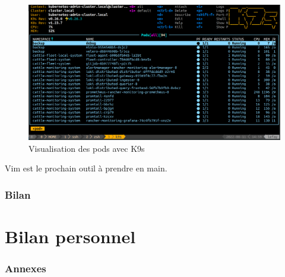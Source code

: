 \documentclass[12pt]{article}
\begin{document}
\begin{figure}[!ht]
    \centering
        \includegraphics[width=\textwidth]{src/interface_k9s.png}
    \caption{Visualisation des pods avec K9s}
    \label{fig:k9s}
\end{figure}

Vim est le prochain outil à prendre en main.

\newpage
\section{Bilan}

\newpage
\part{Bilan personnel}


\newpage
\section*{Annexes}
\end{document}
